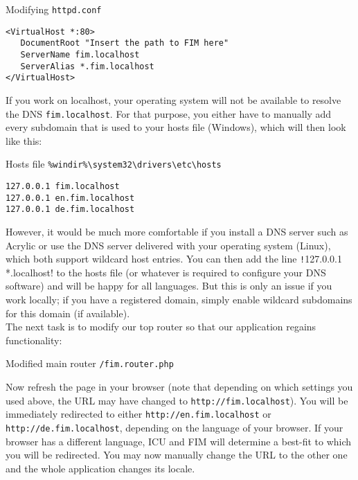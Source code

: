 \documentclass{scrartcl}
\begin{document}
      \begin{listing}[H]
         \caption{Modifying \texttt{httpd.conf}}
         \begin{verbatim}
<VirtualHost *:80>
   DocumentRoot "Insert the path to FIM here"
   ServerName fim.localhost
   ServerAlias *.fim.localhost
</VirtualHost>
         \end{verbatim}
         \label{virtualHost}
      \end{listing}
      If you work on localhost, your operating system will not be available to resolve the DNS \texttt{fim.localhost}. For that purpose, you either have to manually add every subdomain that is used to your hosts file (Windows), which will then look like this:
      \begin{listing}[H]
         \caption{Hosts file \texttt{\%windir\%\textbackslash system32\textbackslash drivers\textbackslash etc\textbackslash hosts}}
         \begin{verbatim}
127.0.0.1 fim.localhost
127.0.0.1 en.fim.localhost
127.0.0.1 de.fim.localhost
         \end{verbatim}
      \end{listing}
      However, it would be much more comfortable if you install a DNS server such as Acrylic or use the DNS server delivered with your operating system (Linux), which both support wildcard host entries. You can then add the line \texttt!127.0.0.1 *.localhost! to the hosts file (or whatever is required to configure your DNS software) and will be happy for all languages. But this is only an issue if you work locally; if you have a registered domain, simply enable wildcard subdomains for this domain (if available). \\
      The next task is to modify our top router so that our application regains functionality:
      \begin{listing}[H]
         \caption{Modified main router \texttt{/fim.router.php}}
      \end{listing}
      Now refresh the page in your browser (note that depending on which settings you used above, the URL may have changed to \texttt{http://fim.localhost}). You will be immediately redirected to either \texttt{http://en.fim.localhost} or \texttt{http://de.fim.localhost}, depending on the language of your browser. If your browser has a different language, ICU and FIM will determine a best-fit to which you will be redirected. You may now manually change the URL to the other one and the whole application changes its locale. \\
\end{document}
